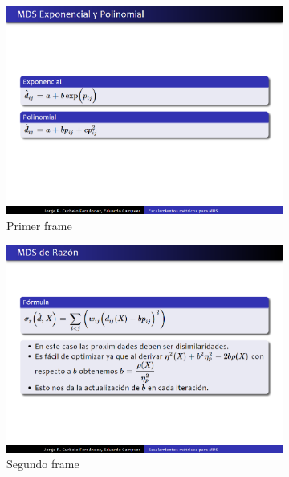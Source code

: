  		\begin{figure}[tb]
 			\centering
 			\begin{subfigure}[b]{0.3\textwidth}
 				\includegraphics[width=\textwidth]{img/f1}
 				\caption{Primer frame}
 				\label{fig:frames_a}	
 			\end{subfigure}
 			\hspace*{\fill}
 			\begin{subfigure}[b]{0.3\textwidth}
 				\includegraphics[width=\textwidth]{img/f2}
 				\caption{Segundo frame}
 				\label{fig:frames_b}	
 			\end{subfigure}
 			\hspace*{\fill}
 			\begin{subfigure}[b]{0.3\textwidth}

\end{subfigure}
\end{figure}
